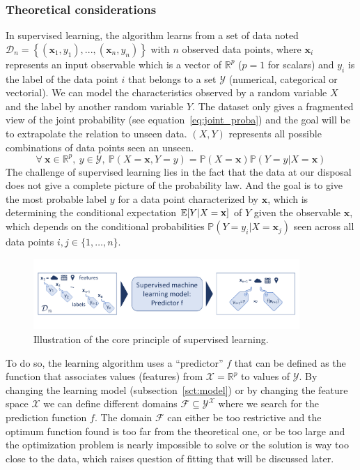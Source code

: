 \documentclass[main]{subfiles}
\begin{document}
\subsubsection{Theoretical considerations}

In supervised learning, the algorithm learns from a set of data noted $\mathcal{D}_{n}=\left\{(\mathbf{x}_{1},y_{1}),...,(\mathbf{x}_{n},y_{n})\right\}$ with $n$ observed data points, where $\mathbf{x}_{i}$ represents an input observable which is a vector of $\mathbb{R}^{p}$ ($p=1$ for scalars) and $y_{i}$ is the label of the data point $i$ that belongs to a set $\mathcal{Y}$ (numerical, categorical or vectorial). 
We can model the characteristics observed by a random variable $X$ and the label by another random variable $Y$. The dataset only gives a fragmented view of the joint probability (see equation~\ref{eq:joint_proba}) and the goal will be to extrapolate the relation to unseen data. $(X,Y)$ represents all possible combinations of data points seen an unseen.
\begin{equation}\label{eq:joint_proba}
  \forall\ \mathbf{x}\in\mathbb{R}^{p},\ y\in\mathcal{Y},\ \mathbb{P}\left(X=\mathbf{x}, Y=y\right) = \mathbb{P}(X=\mathbf{x})\mathbb{P}(Y=y|X=\mathbf{x})
\end{equation}
The challenge of supervised learning lies in the fact that the data at our disposal does not give a complete picture of the probability law. And the goal is to give the most probable label $y$ for a data point characterized by $\mathbf{x}$, which is determining the conditional expectation $\mathbb{E}{\left[Y|X=\mathbf{x}\right]}$ of $Y$ given the observable $\mathbf{x}$, which depends on the conditional probabilities $\mathbb{P}(Y=y_i|X=\mathbf{x}_j)$ seen across all data points $i,j\in\{1,\ldots,n\}$.

\begin{figure}[ht]
  \centering
    \includegraphics[width=0.9\textwidth]{figures/4-ml/machine learning.pdf}
    \caption{Illustration of the core principle of supervised learning.}\label{fgr:supervised_leaning}
\end{figure}

To do so, the learning algorithm uses a ``predictor'' $f$ that can be defined as the function that associates values (features) from $\mathcal{X}=\mathbb{R}^{p}$ to values of $\mathcal{Y}$. By changing the learning model (subsection~\ref{sct:model}) or by changing the feature space $\mathcal{X}$ we can define different domains $\mathcal{F}\subseteq{\mathcal{Y}}^{\mathcal{X}}$ where we search for the prediction function $f$. The domain $\mathcal{F}$ can either be too restrictive and the optimum function found is too far from the theoretical one, or be too large and the optimization problem is nearly impossible to solve or the solution is way too close to the data, which raises question of fitting that will be discussed later.
\end{document}
